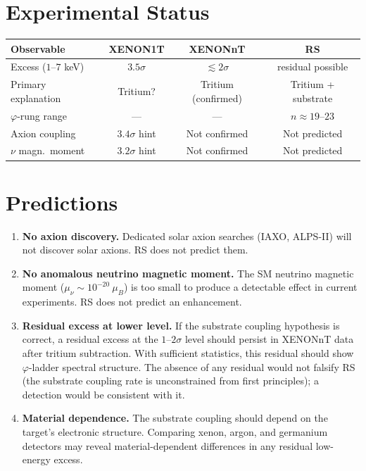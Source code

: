 \documentclass[12pt,a4paper]{article}
\theoremstyle{definition}
\theoremstyle{remark}
\begin{document}
\section{Experimental Status}
\label{sec:compare}

\begin{center}
\renewcommand{\arraystretch}{1.3}
\begin{tabular}{lccc}
\toprule
\textbf{Observable} & \textbf{XENON1T} & \textbf{XENONnT} & \textbf{RS}\\
\midrule
Excess ($1$--$7$ keV) & $3.5\sigma$ & $\lesssim 2\sigma$ & residual possible\\
Primary explanation & Tritium? & Tritium (confirmed) & Tritium + substrate\\
$\varphi$-rung range & --- & --- & $n \approx 19$--$23$\\
Axion coupling & $3.4\sigma$ hint & Not confirmed & Not predicted\\
$\nu$ magn.\ moment & $3.2\sigma$ hint & Not confirmed & Not predicted\\
\bottomrule
\end{tabular}
\end{center}

\section{Predictions}
\label{sec:predict}

\begin{enumerate}
  \item \textbf{No axion discovery.}  Dedicated solar axion searches
  (IAXO, ALPS-II) will not discover solar axions.  RS does not predict
  them.

  \item \textbf{No anomalous neutrino magnetic moment.}  The SM neutrino
  magnetic moment ($\mu_\nu \sim 10^{-20}~\mu_B$) is too small to
  produce a detectable effect in current experiments.  RS does not
  predict an enhancement.

  \item \textbf{Residual excess at lower level.}  If the substrate
  coupling hypothesis is correct, a residual excess at the $1$--$2\sigma$
  level should persist in XENONnT data after tritium subtraction.  With
  sufficient statistics, this residual should show $\varphi$-ladder
  spectral structure.  The absence of any residual would not falsify RS
  (the substrate coupling rate is unconstrained from first principles);
  a detection would be consistent with it.

  \item \textbf{Material dependence.}  The substrate coupling should
  depend on the target's electronic structure.  Comparing xenon, argon,
  and germanium detectors may reveal material-dependent differences in
  any residual low-energy excess.
\end{enumerate}
\end{document}
